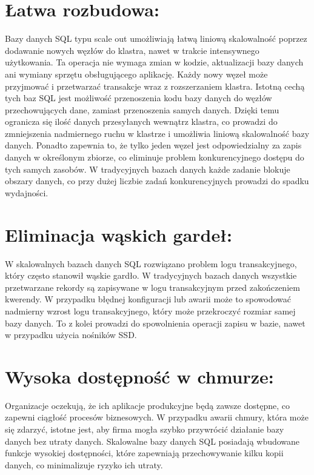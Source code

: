 \documentclass[letterpaper,10pt,polish]{sphinxmanual}
\begin{document}
\section{Łatwa rozbudowa:}
\label{\detokenize{rozdzialy/rozdzial4:latwa-rozbudowa}}
\sphinxAtStartPar
Bazy danych SQL typu scale out umożliwiają łatwą liniową skalowalność poprzez dodawanie nowych węzłów do klastra, nawet w trakcie intensywnego użytkowania. Ta operacja nie wymaga zmian w kodzie, aktualizacji bazy danych ani wymiany sprzętu obsługującego aplikację. Każdy nowy węzeł może przyjmować i przetwarzać transakcje wraz z rozszerzaniem klastra. Istotną cechą tych baz SQL jest możliwość przenoszenia kodu bazy danych do węzłów przechowujących dane, zamiast przenoszenia samych danych. Dzięki temu ogranicza się ilość danych przesyłanych wewnątrz klastra, co prowadzi do zmniejszenia nadmiernego ruchu w klastrze i umożliwia liniową skalowalność bazy danych. Ponadto zapewnia to, że tylko jeden węzeł jest odpowiedzialny za zapis danych w określonym zbiorze, co eliminuje problem konkurencyjnego dostępu do tych samych zasobów. W tradycyjnych bazach danych każde zadanie blokuje obszary danych, co przy dużej liczbie zadań konkurencyjnych prowadzi do spadku wydajności.


\section{Eliminacja wąskich gardeł:}
\label{\detokenize{rozdzialy/rozdzial4:eliminacja-waskich-gardel}}
\sphinxAtStartPar
W skalowalnych bazach danych SQL rozwiązano problem logu transakcyjnego, który często stanowił wąskie gardło. W tradycyjnych bazach danych wszystkie przetwarzane rekordy są zapisywane w logu transakcyjnym przed zakończeniem kwerendy. W przypadku błędnej konfiguracji lub awarii może to spowodować nadmierny wzrost logu transakcyjnego, który może przekroczyć rozmiar samej bazy danych. To z kolei prowadzi do spowolnienia operacji zapisu w bazie, nawet w przypadku użycia nośników SSD.


\section{Wysoka dostępność w chmurze:}
\label{\detokenize{rozdzialy/rozdzial4:wysoka-dostepnosc-w-chmurze}}
\sphinxAtStartPar
Organizacje oczekują, że ich aplikacje produkcyjne będą zawsze dostępne, co zapewni ciągłość procesów biznesowych. W przypadku awarii chmury, która może się zdarzyć, istotne jest, aby firma mogła szybko przywrócić działanie bazy danych bez utraty danych. Skalowalne bazy danych SQL posiadają wbudowane funkcje wysokiej dostępności, które zapewniają przechowywanie kilku kopii danych, co minimalizuje ryzyko ich utraty.
\end{document}
